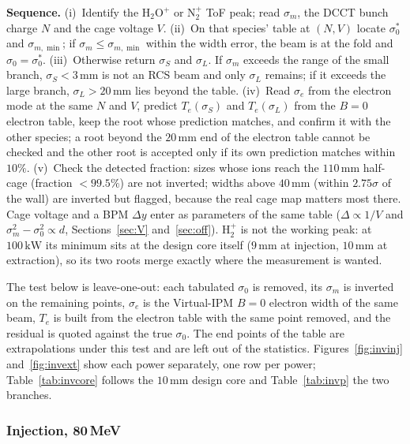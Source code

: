 \documentclass[hyperref]{cernrep}
\begin{document}
\medskip\noindent\textbf{Sequence.}
(i)~Identify the $\mathrm{H}_2\mathrm{O}^+$ or $\mathrm{N}_2^+$ ToF
peak; read $\sigma_m$, the DCCT bunch charge $N$ and the cage voltage
$V$. (ii)~On that species' table at $(N,V)$ locate $\sigma_0^*$ and
$\sigma_{m,\min}$; if $\sigma_m\le\sigma_{m,\min}$ within the width
error, the beam is at the fold and $\sigma_0=\sigma_0^*$.
(iii)~Otherwise return $\sigma_S$ and $\sigma_L$. If $\sigma_m$ exceeds
the range of the small branch, $\sigma_S<3\,\mathrm{mm}$ is not an RCS
beam and only $\sigma_L$ remains; if it exceeds the large branch,
$\sigma_L>20\,\mathrm{mm}$ lies beyond the table. (iv)~Read $\sigma_e$
from the electron mode at the same $N$ and $V$, predict $T_e(\sigma_S)$
and $T_e(\sigma_L)$ from the $B=0$ electron table, keep the root whose
prediction matches, and confirm it with the other species; a root
beyond the $20\,\mathrm{mm}$ end of the electron table cannot be
checked and the other root is accepted only if its own prediction
matches within $10\%$. (v)~Check the detected
fraction: sizes whose ions reach the $110\,\mathrm{mm}$ half-cage
(fraction $<99.5\%$) are not inverted; widths above $40\,\mathrm{mm}$
(within $2.75\sigma$ of the wall) are inverted but flagged, because the
real cage map matters most there. Cage voltage and a BPM $\Delta y$
enter as parameters of the same table ($\Delta\propto 1/V$ and
$\sigma_m^2-\sigma_0^2\propto d$, Sections~\ref{sec:V}
and~\ref{sec:off}). $\mathrm{H}_2^+$ is not the working peak: at $100\,\mathrm{kW}$ its minimum sits at the design
core itself ($9\,\mathrm{mm}$ at injection, $10\,\mathrm{mm}$ at
extraction), so its two roots merge exactly where the measurement is
wanted.

The test below is leave-one-out: each tabulated $\sigma_0$ is removed,
its $\sigma_m$ is inverted on the remaining points, $\sigma_e$ is the
Virtual-IPM $B=0$ electron width of the same beam, $T_e$ is built from
the electron table with the same point removed, and the residual is
quoted against the true $\sigma_0$. The end points of the table are
extrapolations under this test and are left out of the statistics.
Figures~\ref{fig:invinj} and~\ref{fig:invext} show each power
separately, one row per power; Table~\ref{tab:invcore} follows the
$10\,\mathrm{mm}$ design core and Table~\ref{tab:invp} the two
branches.

\subsubsection{Injection, 80\,MeV}
\end{document}
